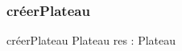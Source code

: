 \subsubsection{créerPlateau}

\begin{algorithme}
\small
\fonction
{créerPlateau}
{}
{Plateau}
{res : Plateau}
{
{}
}
\end{algorithme}